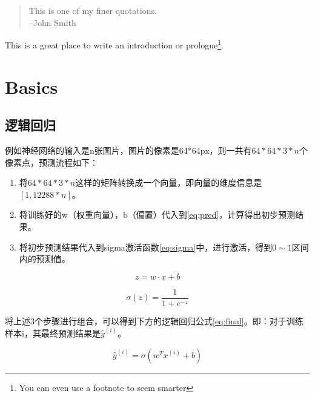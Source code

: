 \documentclass[oneside,10pt]{memoir} %
\begin{document}
\begin{quote}
This is one of my finer quotations.\\
--John Smith
\end{quote}

This is a great place to write an introduction or prologue\footnote{You can even use a footnote to seem smarter}.


\part{Basics}


\chapter{逻辑回归}

例如神经网络的输入是n张图片，图片的像素是64*64px，则一共有$64*64*3*n$个像素点，预测流程如下：

\begin{enumerate}
    \item 将$64*64*3*n$这样的矩阵转换成一个向量，即向量的维度信息是$[1,12288*n]$。
    \item 将训练好的w（权重向量），b（偏置）代入到\ref*{eq:pred}，计算得出初步预测结果。
    \item 将初步预测结果代入到sigma激活函数\ref*{eq:sigma}中，进行激活，得到$0\sim 1$区间内的预测值。
\end{enumerate}

\begin{equation} \label{eq:pred}
    z = w \cdot x +b
\end{equation}

\begin{equation} \label{eq:sigma}
    \sigma (z)=\frac{1}{1+e^{-z}}
\end{equation}

将上述3个步骤进行组合，可以得到下方的逻辑回归公式\ref*{eq:final}。即：对于训练样本i，其最终预测结果是$\hat{y}^{(i)}$。

\begin{equation} \label{eq:final}
    \hat{y}^{(i)} = \sigma (w^Tx^{(i)}+b)
\end{equation}
\end{document}
